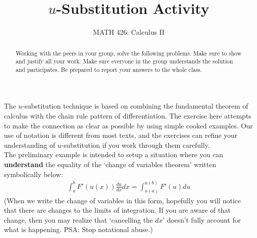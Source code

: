 \documentclass{ximera}
\title{$u$-Substitution Activity}
\author{MATH 426: Calculus II}
\begin{document}
\begin{abstract}
   Working with the peers in your group, solve the following problems. Make sure to show and justify all your work. Make sure everyone in the group understands the solution and participates. Be prepared to report your answers to the whole class. 
\end{abstract}
\maketitle

The $u$-substitution technique is based on combining the fundamental theorem of calculus with the chain rule pattern of differentiation. The exercise here attempts to make the connection as clear as possible by using simple cooked examples. Our use of notation is different from most texts, and the exercises can refine your understanding of $u$-substitution if you work through them carefully.\\

The preliminary example is intended to setup a situation where you can {\bf{understand}} the equality of the `change of variables theorem' written symbolically below:
\begin{align}
	\int_{a}^b F'(u(x))\frac{du}{dx} dx = \int_{u(a)}^{u(b)} F'(u)du \nonumber
\end{align}
(When we write the change of variables in this form, hopefully you will notice that there are changes to the limits of integration. If you are aware of that change, then you may realize that `cancelling the $dx$' doesn't fully account for what is happening. PSA: Stop notational abuse.)
\end{document}
